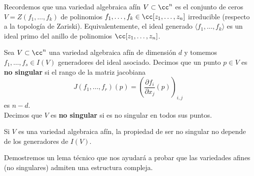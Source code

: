     Recordemos que una variedad algebraica afín $V\subset \cc^n$ es el conjunto de ceros $V=Z(f_1,\dots,f_k)$ de polinomios $f_1,\dots,f_k\in\cc[z_1,\dots,z_n]$ irreducible (respecto a la topología de Zariski). Equivalentemente, el ideal generado $\langle f_1,\dots,f_k\rangle$ es un ideal primo del anillo de polinomios $\cc[z_1,\dots,z_n]$.
    
    \begin{definition}
    	Sea $V\subset\cc^n$ una variedad algebraica afín de dimensión $d$ y tomemos $f_1,\dots, f_s\in I(V)$ generadores del ideal asociado. Decimos que un punto $p\in V$ es \textbf{no singular} si el rango de la matriz jacobiana
    	\begin{equation*}
    		J(f_1,\dots, f_r)(p)=\left(\frac{\partial f_i}{\partial x_j}(p) \right)_{i,j}
    	\end{equation*}
    	es $n-d$.\\
    	Decimos que $V$ es \textbf{no singular} si es no singular en todos sus puntos.
    \end{definition}
    
    \begin{remark}
    	Si $V$ es una variedad algebraica afín, la propiedad de ser no singular no depende de los generadores de $I(V)$.
    \end{remark}
    
    Demostremos un lema técnico que nos ayudará a probar que las variedades afines (no singulares) admiten una estructura compleja.
    
